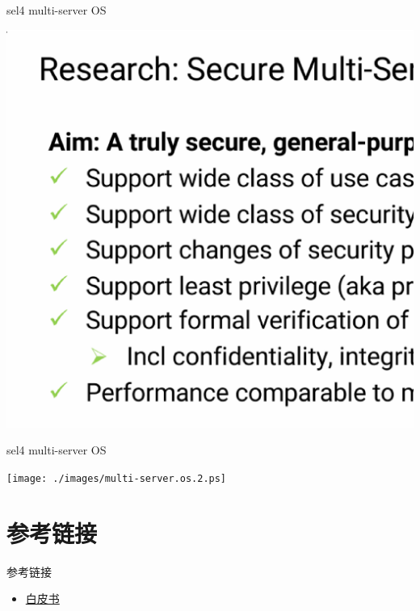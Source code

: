 \documentclass[presentation,dvipdfmx,CJKbookmarks]{beamer}
\begin{document}
\begin{CJK*}{UTF8}{simsun}
\begin{frame}[label={sec:org7ba95ea}]{sel4 multi-server OS}
\begin{center}
\includegraphics[width=.9\linewidth]{./images/multi-server.os.ps}
\end{center}
\end{frame}

\begin{frame}[label={sec:org42cd3cd}]{sel4 multi-server OS}
\begin{center}
\texttt{[image: ./images/multi-server.os.2.ps]}
\end{center}
\end{frame}
\section{参考链接}
\label{sec:org4a0dc7d}
\begin{frame}[label={sec:orgcd16e74}]{参考链接}
\begin{itemize}
\item \href{https://sel4.systems/About/seL4-whitepaper.pdf}{白皮书}
\end{itemize}
\end{frame}
\end{CJK*}
\end{document}
